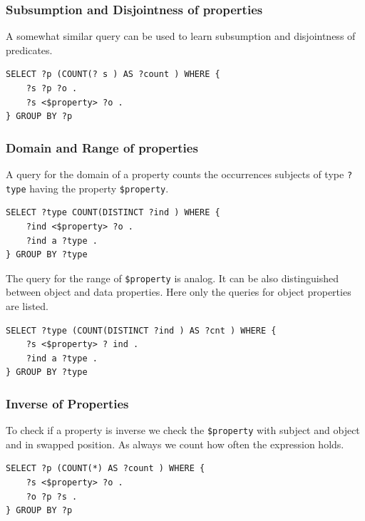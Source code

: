 \subsubsection*{Subsumption and Disjointness of properties}
A somewhat similar query can be used to learn subsumption and disjointness of
predicates.

\begin{lstlisting} 
SELECT ?p (COUNT(? s ) AS ?count ) WHERE {
	?s ?p ?o .
	?s <$property> ?o .
} GROUP BY ?p
\end{lstlisting}

\subsubsection*{Domain and Range of properties}
A query for the domain of a property counts the occurrences subjects of type
\texttt{?type} having the property \texttt{\$property}.

\begin{lstlisting} 
SELECT ?type COUNT(DISTINCT ?ind ) WHERE {
	?ind <$property> ?o .
	?ind a ?type .
} GROUP BY ?type
\end{lstlisting}

The query for the range of \texttt{\$property} is analog. It can be also
distinguished between object and data properties. Here only the queries for
object properties are listed.
\begin{lstlisting} 
SELECT ?type (COUNT(DISTINCT ?ind ) AS ?cnt ) WHERE {
	?s <$property> ? ind .
	?ind a ?type .
} GROUP BY ?type
\end{lstlisting}


\subsubsection*{Inverse of Properties}
To check if a property is inverse we check the \texttt{\$property} with subject
and object and in swapped position. As always we count how often the expression
holds.
\begin{lstlisting} 
SELECT ?p (COUNT(*) AS ?count ) WHERE {
	?s <$property> ?o .
	?o ?p ?s .
} GROUP BY ?p
\end{lstlisting}



